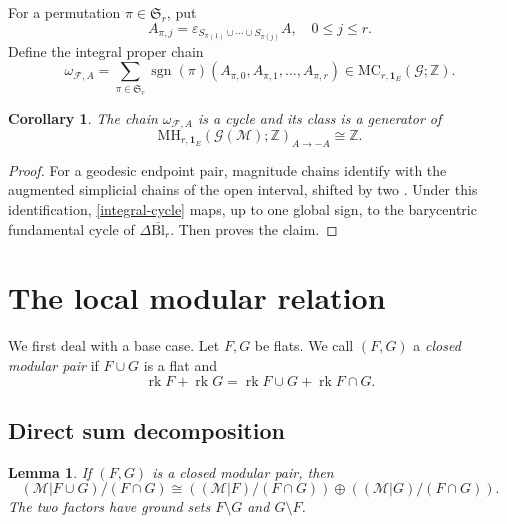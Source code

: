 \documentclass[10pt]{amsart}
\theoremstyle{plain}
\newtheorem{lemma}[theorem]{Lemma}
\newtheorem{corollary}[theorem]{Corollary}
\theoremstyle{definition}
\newcommand{\one}{\mathbf{1}}
\newcommand{\ZZ}{\mathbb{Z}}
\DeclareMathOperator{\sgn}{sgn}
\newcommand{\F}{\mathcal{F}}
\newcommand{\G}{\mathcal{G}}
\newcommand{\MC}{\mathrm{MC}}
\newcommand{\MH}{\mathrm{MH}}
\newcommand{\Bl}{\mathrm{Bl}}
\newcommand{\M}{\mathcal{M}}
\newcommand{\rk}{\operatorname{rk}}
\newcommand{\eps}{\varepsilon}
\begin{document}
For a permutation $\pi\in \mathfrak{S}_r$, put
\[
A_{\pi,j}=\eps_{S_{\pi(1)}\cup\cdots\cup S_{\pi(j)}}A,\quad 0\leq j\leq r.
\]
Define the integral proper chain
\begin{equation}\label{integral-cycle}
\omega_{\F,A}=\sum_{\pi\in \mathfrak{S}_r}\sgn(\pi)(A_{\pi,0},A_{\pi,1},\ldots,A_{\pi,r})\in\MC_{r,\one_E}(\G;\ZZ).
\end{equation}

\begin{corollary}\label{antipodal-basis}
The chain $\omega_{\mathcal F,A}$ is a cycle and its class is a generator of
\[
\MH_{r,\one_E}(\G(\M);\ZZ)_{A\to -A}\cong\ZZ.
\]
\end{corollary}

\begin{proof}
For a geodesic endpoint pair, magnitude chains identify with the augmented simplicial chains of the open interval, shifted by two \cite[Proposition~2.3]{Koizumi2026a}. Under this identification, \eqref{integral-cycle} maps, up to one global sign, to the barycentric fundamental cycle of $\Delta\overline{\Bl}_r$. Then  proves the claim.
\end{proof}




\section{The local modular relation}\label{local-modular}

We first deal with a base case. Let $F,G$ be flats. We call $(F,G)$ a \emph{closed modular pair} if $F\cup G$ is a flat and
\begin{equation}\label{modular-def}
\rk F+\rk G=\rk F\cup G+\rk F\cap G.
\end{equation}

\subsection{Direct sum decomposition}

\begin{lemma}\label{modular-direct-sum}
If $(F,G)$ is a closed modular pair, then
\begin{equation}\label{modular-sum-eq}
(\M|F\cup G)/(F\cap G)\cong((\M|F)/(F\cap G))\oplus((\M|G)/(F\cap G)).
\end{equation}
The two factors have ground sets $F\setminus G$ and $G\setminus F$.
\end{lemma}
\end{document}
